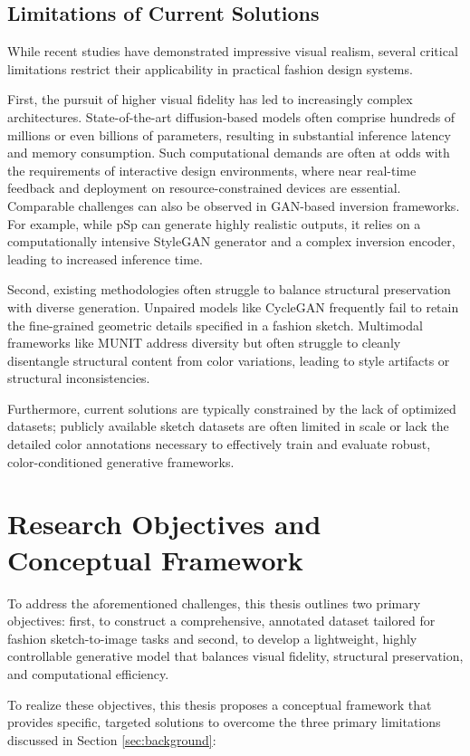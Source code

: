 \documentclass[../main.tex]{subfiles}
\begin{document}
\subsection{Limitations of Current Solutions}
While recent studies have demonstrated impressive visual realism, several critical limitations restrict their applicability in practical fashion design systems. 

First, the pursuit of higher visual fidelity has led to increasingly complex architectures. State-of-the-art diffusion-based models often comprise hundreds of millions or even billions of parameters, resulting in substantial inference latency and memory consumption. Such computational demands are often at odds with the requirements of interactive design environments, where near real-time feedback and deployment on resource-constrained devices are essential. Comparable challenges can also be observed in GAN-based inversion frameworks. For example, while pSp can generate highly realistic outputs, it relies on a computationally intensive StyleGAN generator and a complex inversion encoder, leading to increased inference time.

Second, existing methodologies often struggle to balance structural preservation with diverse generation. Unpaired models like CycleGAN frequently fail to retain the fine-grained geometric details specified in a fashion sketch. Multimodal frameworks like MUNIT address diversity but often struggle to cleanly disentangle structural content from color variations, leading to style artifacts or structural inconsistencies.

Furthermore, current solutions are typically constrained by the lack of optimized datasets; publicly available sketch datasets are often limited in scale or lack the detailed color annotations necessary to effectively train and evaluate robust, color-conditioned generative frameworks.

\section{Research Objectives and Conceptual Framework}
\label{sec:objectives}
To address the aforementioned challenges, this thesis outlines two primary objectives: first, to construct a comprehensive, annotated dataset tailored for fashion sketch-to-image tasks and second, to develop a lightweight, highly controllable generative model that balances visual fidelity, structural preservation, and computational efficiency. 

To realize these objectives, this thesis proposes a conceptual framework that provides specific, targeted solutions to overcome the three primary limitations discussed in Section \ref{sec:background}:
\end{document}
